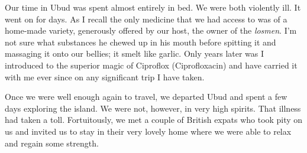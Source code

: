 Our time in Ubud was spent almost entirely in bed. We were both
violently ill. It went on for days. As I recall the only medicine that
we had access to was of a home-made variety, generously offered by our
host, the owner of the \emph{losmen}. I'm not sure what substances he
chewed up in his mouth before spitting it and massaging it onto our
bellies; it smelt like garlic. Only years later was I introduced to the
superior magic of Ciproflox (Ciprofloxacin) and have carried it with me
ever since on any significant trip I have taken.

Once we were well enough again to travel, we departed Ubud and spent a
few days exploring the island. We were not, however, in very high
spirits. That illness had taken a toll. Fortuitously, we met a couple of
British expats who took pity on us and invited us to stay in their very
lovely home where we were able to relax and regain some strength.

